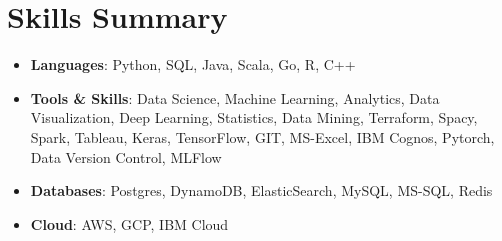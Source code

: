 \documentclass[letterpaper,10pt]{article}
\newcommand{\resumeItem}[3]{
  \item\small{
    \textbf{#1}{: #2}{\\
     \textit{\small{Technology Used: }}\small#3\vspace{-2pt}}
  }
}
\newcommand{\resumeSubItem}[2]{
  \item\small{
    \textbf{#1}{: #2\vspace{-3pt}}
  }
}
\newcommand{\resumeSubHeadingListStart}{\begin{itemize}[leftmargin=*]}
\newcommand{\resumeSubHeadingListEnd}{\end{itemize}}
\newcommand{\resumeItemListStart}{\begin{itemize}}
\newcommand{\resumeItemListEnd}{\end{itemize}\vspace{-5pt}}
\begin{document}
\section{Skills Summary}
	\resumeSubHeadingListStart
	\resumeSubItem{Languages}{Python, SQL, Java, Scala, Go, R, C++}
	\resumeSubItem{Tools \& Skills}{Data Science, Machine Learning, Analytics, Data Visualization, Deep Learning, Statistics, Data Mining, Terraform, Spacy, Spark, Tableau, Keras, TensorFlow, GIT, MS-Excel, IBM Cognos, Pytorch, Data Version Control, MLFlow}
	\resumeSubItem{Databases}{ Postgres, DynamoDB, ElasticSearch, MySQL, MS-SQL, Redis }
	\resumeSubItem{Cloud}{AWS, GCP, IBM Cloud }
	
\resumeSubHeadingListEnd

\end{document}
